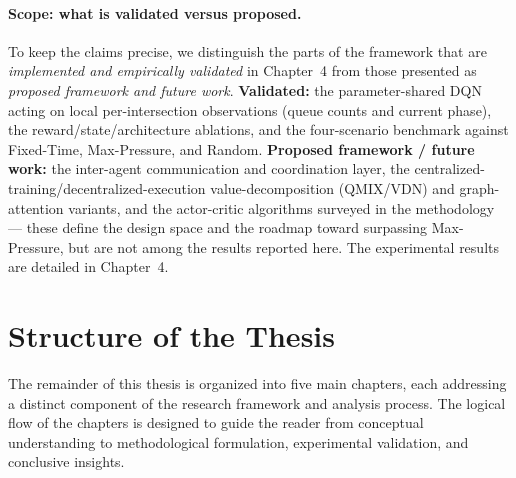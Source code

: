 \documentclass[12pt]{report} %
\begin{document}
\paragraph{Scope: what is validated versus proposed.} To keep the claims precise, we distinguish the parts of the framework that are \emph{implemented and empirically validated} in Chapter~4 from those presented as \emph{proposed framework and future work}. \textbf{Validated:} the parameter-shared DQN acting on local per-intersection observations (queue counts and current phase), the reward/state/architecture ablations, and the four-scenario benchmark against Fixed-Time, Max-Pressure, and Random. \textbf{Proposed framework / future work:} the inter-agent communication and coordination layer, the centralized-training/decentralized-execution value-decomposition (QMIX/VDN) and graph-attention variants, and the actor-critic algorithms surveyed in the methodology --- these define the design space and the roadmap toward surpassing Max-Pressure, but are not among the results reported here. The experimental results are detailed in Chapter~4.


\section{Structure of the Thesis}

The remainder of this thesis is organized into five main chapters, each addressing a distinct component of the research framework and analysis process. The logical flow of the chapters is designed to guide the reader from conceptual understanding to methodological formulation, experimental validation, and conclusive insights.
\end{document}
